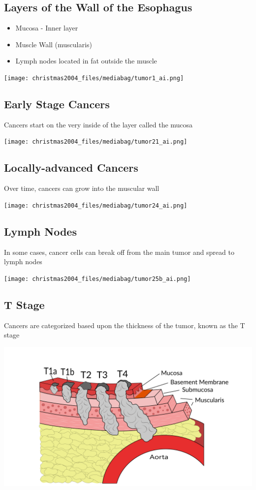 \documentclass[
  letterpaper,
  DIV=11,
  numbers=noendperiod]{scrartcl}
\providecommand{\tightlist}{%
  \setlength{\itemsep}{0pt}\setlength{\parskip}{0pt}}\usepackage{longtable,booktabs,array}
\begin{document}
\subsection{Layers of the Wall of the
Esophagus}\label{layers-of-the-wall-of-the-esophagus}

\begin{itemize}
\tightlist
\item
  Mucosa - Inner layer
\item
  Muscle Wall (muscularis)
\item
  Lymph nodes located in fat outside the muscle
\end{itemize}

\texttt{[image: christmas2004\_files/mediabag/tumor1\_ai.png]}

\subsection{Early Stage Cancers}\label{early-stage-cancers}

Cancers start on the very inside of the layer called the mucosa

\texttt{[image: christmas2004\_files/mediabag/tumor21\_ai.png]}

\subsection{Locally-advanced Cancers}\label{locally-advanced-cancers}

Over time, cancers can grow into the muscular wall

\texttt{[image: christmas2004\_files/mediabag/tumor24\_ai.png]}

\subsection{Lymph Nodes}\label{lymph-nodes}

In some cases, cancer cells can break off from the main tumor and spread
to lymph nodes

\texttt{[image: christmas2004\_files/mediabag/tumor25b\_ai.png]}

\subsection{T Stage}\label{t-stage}

Cancers are categorized based upon the thickness of the tumor, known as
the T stage

\includegraphics{christmas2004_files/mediabag/tumor_t_full.png}
\end{document}
